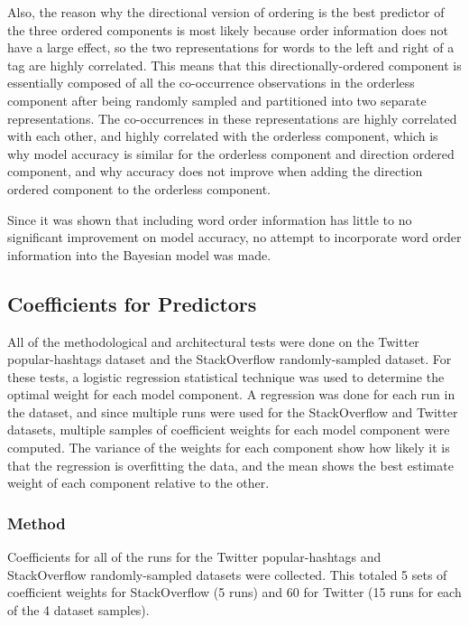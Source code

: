 \documentclass[man,floatsintext,donotrepeattitle]{apa6}
\begin{document}
Also, the reason why the directional version of ordering is the best predictor of the three ordered components is most likely because order information does not have a large effect,
so the two representations for words to the left and right of a tag are highly correlated.
This means that this directionally-ordered component is essentially composed of all the co-occurrence observations in the orderless component after being randomly sampled and partitioned into two separate representations.
The co-occurrences in these representations are highly correlated with each other, and highly correlated with the orderless component,
which is why model accuracy is similar for the orderless component and direction ordered component, and why accuracy does not improve when adding the direction ordered component to the orderless component.

Since it was shown that including word order information has little to no significant improvement on model accuracy, no attempt to incorporate word order information into the Bayesian model was made.

\subsection{Coefficients for Predictors}

All of the methodological and architectural tests were done on the Twitter popular-hashtags dataset and the StackOverflow randomly-sampled dataset.
For these tests, a logistic regression statistical technique was used to determine the optimal weight for each model component.
A regression was done for each run in the dataset, and since multiple runs were used for the StackOverflow and Twitter datasets, multiple samples of coefficient weights for each model component were computed.
The variance of the weights for each component show how likely it is that the regression is overfitting the data,
and the mean shows the best estimate weight of each component relative to the other.

\subsubsection{Method}

Coefficients for all of the runs for the Twitter popular-hashtags and StackOverflow randomly-sampled datasets were collected.
This totaled 5 sets of coefficient weights for StackOverflow (5 runs) and 60 for Twitter (15 runs for each of the 4 dataset samples).
\end{document}
